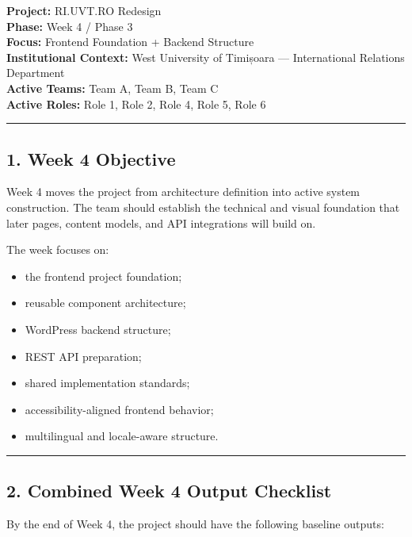 \documentclass[12pt,a4paper]{article}
\providecommand{\tightlist}{\setlength{\itemsep}{0pt}\setlength{\parskip}{0pt}}
\begin{document}
\textbf{Project:} RI.UVT.RO Redesign\\
\textbf{Phase:} Week 4 / Phase 3\\
\textbf{Focus:} Frontend Foundation + Backend Structure\\
\textbf{Institutional Context:} West University of Timișoara --- International Relations Department\\
\textbf{Active Teams:} Team A, Team B, Team C\\
\textbf{Active Roles:} Role 1, Role 2, Role 4, Role 5, Role 6

\begin{center}\rule{0.5\linewidth}{0.5pt}\end{center}

\subsection{1. Week 4 Objective}\label{week-4-objective}

Week 4 moves the project from architecture definition into active system construction. The team should establish the technical and visual foundation that later pages, content models, and API integrations will build on.

The week focuses on:

\begin{itemize}
\tightlist
\item
  the frontend project foundation;
\item
  reusable component architecture;
\item
  WordPress backend structure;
\item
  REST API preparation;
\item
  shared implementation standards;
\item
  accessibility-aligned frontend behavior;
\item
  multilingual and locale-aware structure.
\end{itemize}

\begin{center}\rule{0.5\linewidth}{0.5pt}\end{center}

\subsection{2. Combined Week 4 Output Checklist}\label{combined-week-4-output-checklist}

By the end of Week 4, the project should have the following baseline outputs:
\end{document}

